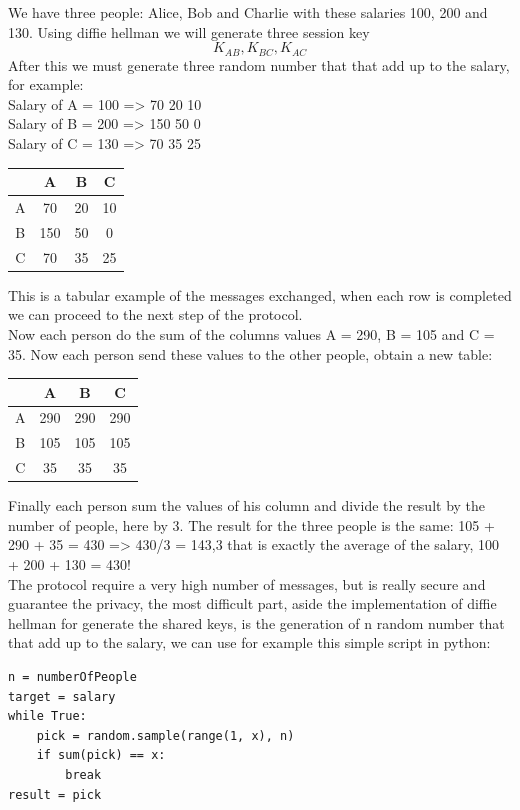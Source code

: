 \documentclass{article}
\begin{document}
We have three people: Alice, Bob and Charlie with these salaries 100, 200 and 130. Using diffie hellman we will generate three session key \[K_{AB}, K_{BC}, K_{AC}\]After this we must generate three random number that that add up to the salary, for example:\\
Salary of A = 100 => 70 20 10\\
Salary of B = 200 => 150 50 0\\
Salary of C = 130 => 70 35 25\\
\begin{center}
\begin{tabular}{ |c|c|c|c| } 
\hline
 & A & B & C\\
\hline
A & 70 & 20 & 10\\
\hline
B & 150 & 50 & 0\\
\hline
C & 70 & 35 & 25\\
\hline
\end{tabular}
\end{center}
This is a tabular example of the messages exchanged, when each row is completed we can proceed to the next step of the protocol.\\
Now each person do the sum of the columns values A = 290, B = 105 and C = 35. Now each person send these values to the other people, obtain a new table:\\
\begin{center}
\begin{tabular}{ |c|c|c|c| } 
\hline
 & A & B & C\\
\hline
A & 290 & 290 & 290\\
\hline
B & 105 & 105 & 105\\
\hline
C & 35 & 35 & 35\\
\hline
\end{tabular}
\end{center}
Finally each person sum the values of his column and divide the result by the number of people, here by 3. The result for the three people is the same: 105 + 290 + 35 = 430 => 430/3 = 143,3 that is exactly the average of the salary, 100 + 200 + 130 = 430!\\
The protocol require a very high number of messages, but is really secure and guarantee the privacy, the most difficult part, aside the implementation of diffie hellman for generate the shared keys, is the generation of n random number that that add up to the salary, we can use for example this simple script in python:\\
\begin{lstlisting}
n = numberOfPeople
target = salary
while True:
    pick = random.sample(range(1, x), n)
    if sum(pick) == x:
        break
result = pick
\end{lstlisting}
\end{document}
